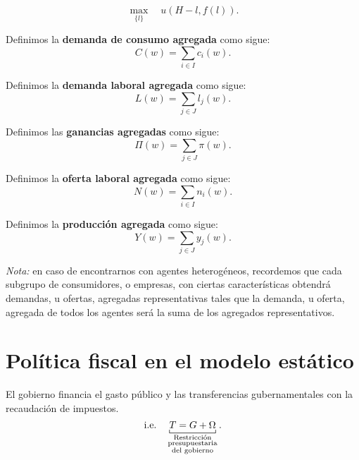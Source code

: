 \documentclass[8pt,a4paper]{extarticle}
\begin{document}
\begin{multicols}{3}
	\[
		\max_{\{l\}} \quad u(H - l, f(l))
		.\]

	\begin{boxdef}
		Definimos la \textbf{demanda de consumo agregada} como sigue:
		\[
			C(w) = \sum_{i \in I} c_i(w)
			.\]
	\end{boxdef}

	\begin{boxdef}
		Definimos la \textbf{demanda laboral agregada} como sigue:
		\[
			L(w) = \sum_{j \in J} l_j(w)
			.\]
	\end{boxdef}

	\begin{boxdef}
		Definimos las \textbf{ganancias agregadas} como sigue:
		\[
			\Pi(w) = \sum_{j \in J} \pi(w)
			.\]
	\end{boxdef}

	\begin{boxdef}
		Definimos la \textbf{oferta laboral agregada} como sigue:
		\[
			N(w) = \sum_{i \in I} n_i(w)
			.\]
	\end{boxdef}

	\begin{boxdef}
		Definimos la \textbf{producción agregada} como sigue:
		\[
			Y(w) = \sum_{j \in J} y_j(w)
			.\]
	\end{boxdef}

	\emph{Nota:} en caso de encontrarnos con agentes heterogéneos, recordemos que cada subgrupo de consumidores, o empresas, con ciertas características obtendrá demandas, u ofertas, agregadas representativas tales que la demanda, u oferta, agregada de todos los agentes será la suma de los agregados representativos.

	\sectionbreak

	\section{Política fiscal en el modelo estático}

	\begin{boxrmk}[]
		El gobierno financia el gasto público y las transferencias gubernamentales con la recaudación de impuestos.
		\[
			\ie \quad \underbracket[0.5pt]{ T = G + \Omega}_{\substack{\text{\normalfont Restricción} \\ \text{\normalfont presupuestaria} \\ \text{\normalfont del gobierno}}}
			.\]
	\end{boxrmk}


\end{multicols}
\end{document}
